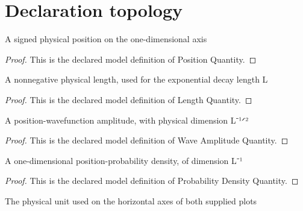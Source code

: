 \section{Declaration topology}
\begin{definition}
  \label{def:physics:phyx-mini-0638:phyxminiproblems-problemphyxmini0638-positionquantity}
  A signed physical position on the one-dimensional axis
\end{definition}
\begin{proof}
  This is the declared model definition of Position Quantity.
\end{proof}
\begin{definition}
  \label{def:physics:phyx-mini-0638:phyxminiproblems-problemphyxmini0638-lengthquantity}
  A nonnegative physical length, used for the exponential decay length L
\end{definition}
\begin{proof}
  This is the declared model definition of Length Quantity.
\end{proof}
\begin{definition}
  \label{def:physics:phyx-mini-0638:phyxminiproblems-problemphyxmini0638-waveamplitudequantity}
  A position-wavefunction amplitude, with physical dimension L⁻¹ᐟ²
\end{definition}
\begin{proof}
  This is the declared model definition of Wave Amplitude Quantity.
\end{proof}
\begin{definition}
  \label{def:physics:phyx-mini-0638:phyxminiproblems-problemphyxmini0638-probabilitydensityquantity}
  A one-dimensional position-probability density, of dimension L⁻¹
\end{definition}
\begin{proof}
  This is the declared model definition of Probability Density Quantity.
\end{proof}
\begin{definition}
  \label{def:physics:phyx-mini-0638:phyxminiproblems-problemphyxmini0638-nanometerunit}
  The physical unit used on the horizontal axes of both supplied plots
\end{definition}
